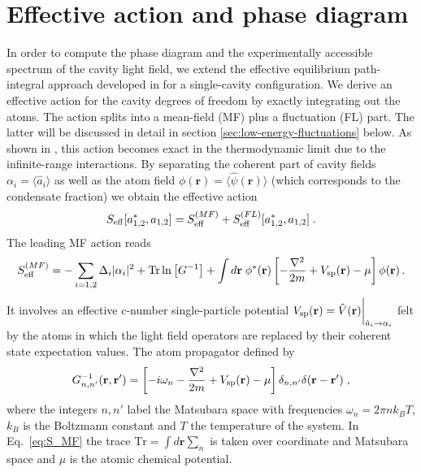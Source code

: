\documentclass[12pt]{iopart}
\begin{document}
\section{Effective action and phase diagram}
\label{sec:formalism}

In order to compute the phase diagram and the experimentally accessible
spectrum of the cavity light field, we extend the effective equilibrium path-integral approach
developed in \cite{piazza_bose} for a single-cavity configuration. We
derive an effective action for the cavity degrees of freedom by
exactly integrating out the atoms. The action
splits into a mean-field (MF) plus a fluctuation (FL) part. The latter will be discussed in
detail in section \ref{sec:low-energy-fluctuations} below.  As shown in \cite{piazza_bose}, this
action becomes exact in the thermodynamic limit due to the infinite-range
interactions. By separating the coherent part of cavity fields
$\alpha_i=\langle\hat{a}_i\rangle$ as well as the atom field
$\phi(\mathbf{r})=\langle\hat{\psi}(\mathbf{r})\rangle$ (which corresponds to the condensate fraction) we obtain
the effective action 
\begin{align}\label{eq:S_eff}
S_{\rm  eff}[a_{1,2}^*,a_{1,2}]=S_{\rm  eff}^{(MF)}+S_{\rm  eff}^{(FL)}[a_{1,2}^*,a_{1,2}]\;.
\end{align}
The leading MF action reads
\begin{align}
\label{eq:S_MF}
S_{\rm
  eff}^{(MF)}=-\sum_{i=1,2}\Delta_i|\alpha_i|^2+\mathrm{Tr}\ln\left[G^{-1}\right]+\int
d\mathbf{r}\;\phi^*(\mathbf{r})\left[-\frac{\nabla^2}{2m}+V_{\rm sp}(\mathbf{r})-\mu \right]\phi(\mathbf{r})\, .
\end{align}
It involves an effective c-number single-particle potential $V_{\rm sp}(\mathbf{r})=\hat{V}(\mathbf{r})\bigg|_{\hat{a}_i\to\alpha_i}$
felt by the atoms in which the light field operators are replaced by their coherent state expectation values.  
The atom propagator defined by
\begin{align}
G_{n,n'}^{-1}(\mathbf{r,r'})=\left[-i\omega_n-\frac{\nabla^2}{2m}+V_{\rm
  sp}(\mathbf{r})-\mu\right]\delta_{n,n'}\delta(\mathbf{r-r'})\;,
\end{align}
where the integers $n,n'$ label the Matsubara space with frequencies $\omega_n=2\pi n
k_BT$, $k_B$ is the Boltzmann constant and $T$ the temperature
of the system. In Eq.~\eqref{eq:S_MF} the trace  $\mathrm{Tr}=\int
d\mathbf{r}\sum_n$ is taken over coordinate and Matsubara space and $\mu$ is
the atomic chemical potential. 
\end{document}
